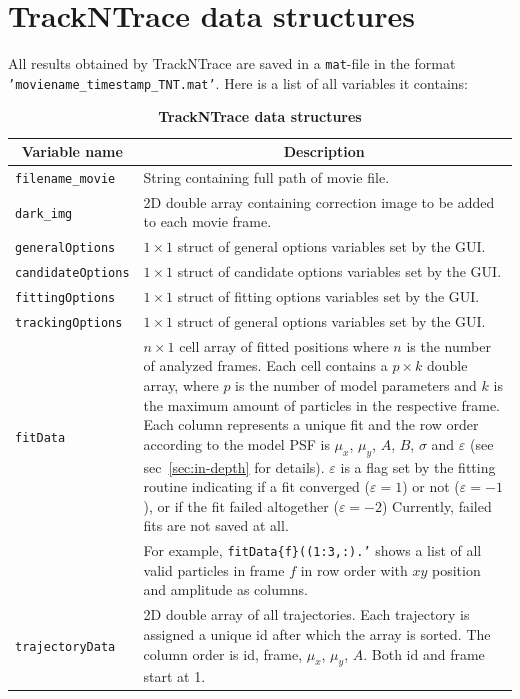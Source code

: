 \documentclass[11pt,onside]{report}
\numberwithin{equation}{chapter}
\begin{document}
\section{TrackNTrace data structures}
All results obtained by TrackNTrace are saved in a \texttt{mat}-file in the format \texttt{'moviename\_timestamp\_TNT.mat'}. Here is a list of all variables it contains:
\begin{table}[!h]
\centering
\caption*{\textbf{TrackNTrace data structures}}
\label{tab:datastruct}
\begin{tabular}{p{} p{}}
\toprule
\multicolumn{1}{c}{Variable name} & \multicolumn{1}{c}{Description}\\ \midrule
\texttt{filename\_movie} & String containing full path of movie file. \\[5pt]
\texttt{dark\_img} & 2D double array containing correction image to be added to each movie frame. \\[5pt]
\texttt{generalOptions} & $1\times1$ struct of general options variables set by the GUI. \\[5pt]
\texttt{candidateOptions} & $1\times1$ struct of candidate options variables set by the GUI. \\[5pt]
\texttt{fittingOptions} & $1\times1$ struct of fitting options variables set by the GUI. \\[5pt]
\texttt{trackingOptions} & $1\times1$ struct of general options variables set by the GUI. \\[5pt]
\texttt{fitData} & $n\times 1$ cell array of fitted positions where $n$ is the number of analyzed frames. Each cell contains a $p\times k$ double array, where $p$ is the number of model parameters and $k$ is the maximum amount of particles in the respective frame. Each column represents a unique fit and the row order according to the model PSF is $\mu_x$, $\mu_y$, $A$, $B$, $\sigma$ and $\varepsilon$ (see sec~\ref{sec:in-depth} for details). $\varepsilon$ is a flag set by the fitting routine indicating if a fit converged ($\varepsilon = 1$) or not ($\varepsilon = -1$), or if the fit failed altogether ($\varepsilon = -2$) Currently, failed fits are not saved at all. \\
 & For example, \texttt{fitData\{f\}((1:3,:).'} shows a list of all valid particles in frame $f$ in row order with $xy$ position and amplitude as columns.\\[5pt]
\texttt{trajectoryData} & 2D double array of all trajectories. Each trajectory is assigned a unique id after which the array is sorted. The column order is id, frame, $\mu_x$, $\mu_y$, $A$. Both id and frame start at 1. \\
\bottomrule
\end{tabular}
\end{table}
\end{document}
